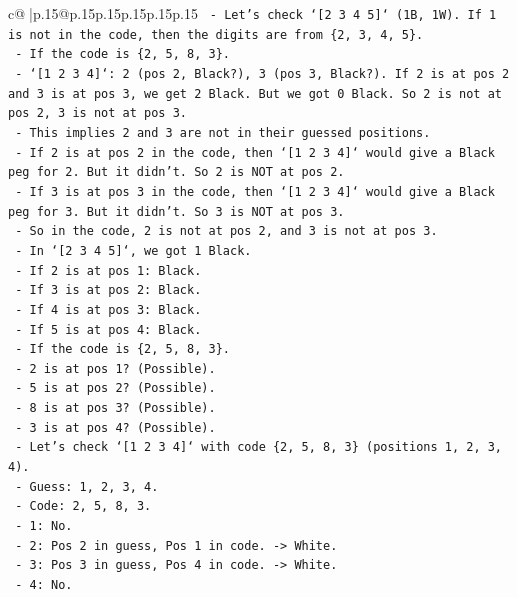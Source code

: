 \documentclass{article}
\begin{document}
{\begin{supertabular}{c@{$\;$}|p{.15\linewidth}@{}p{.15\linewidth}p{.15\linewidth}p{.15\linewidth}p{.15\linewidth}p{.15\linewidth}}
{{{\texttt{  {-} Let's check `{[}2 3 4 5{]}` (1B, 1W). If 1 is not in the code, then the digits are from \{2, 3, 4, 5\}.} \\
\texttt{  {-} If the code is \{2, 5, 8, 3\}.} \\
\texttt{    {-} `{[}1 2 3 4{]}`: 2 (pos 2, Black?), 3 (pos 3, Black?). If 2 is at pos 2 and 3 is at pos 3, we get 2 Black. But we got 0 Black. So 2 is not at pos 2, 3 is not at pos 3.} \\
\texttt{    {-} This implies 2 and 3 are not in their guessed positions.} \\
\texttt{    {-} If 2 is at pos 2 in the code, then `{[}1 2 3 4{]}` would give a Black peg for 2. But it didn't. So 2 is NOT at pos 2.} \\
\texttt{    {-} If 3 is at pos 3 in the code, then `{[}1 2 3 4{]}` would give a Black peg for 3. But it didn't. So 3 is NOT at pos 3.} \\
\texttt{    {-} So in the code, 2 is not at pos 2, and 3 is not at pos 3.} \\
\texttt{    {-} In `{[}2 3 4 5{]}`, we got 1 Black.} \\
\texttt{      {-} If 2 is at pos 1: Black.} \\
\texttt{      {-} If 3 is at pos 2: Black.} \\
\texttt{      {-} If 4 is at pos 3: Black.} \\
\texttt{      {-} If 5 is at pos 4: Black.} \\
\texttt{    {-} If the code is \{2, 5, 8, 3\}.} \\
\texttt{      {-} 2 is at pos 1? (Possible).} \\
\texttt{      {-} 5 is at pos 2? (Possible).} \\
\texttt{      {-} 8 is at pos 3? (Possible).} \\
\texttt{      {-} 3 is at pos 4? (Possible).} \\
\texttt{      {-} Let's check `{[}1 2 3 4{]}` with code \{2, 5, 8, 3\} (positions 1, 2, 3, 4).} \\
\texttt{        {-} Guess: 1, 2, 3, 4.} \\
\texttt{        {-} Code: 2, 5, 8, 3.} \\
\texttt{        {-} 1: No.} \\
\texttt{        {-} 2: Pos 2 in guess, Pos 1 in code. {-}> White.} \\
\texttt{        {-} 3: Pos 3 in guess, Pos 4 in code. {-}> White.} \\
\texttt{        {-} 4: No.} \\
}}}
\end{supertabular}}
\end{document}
